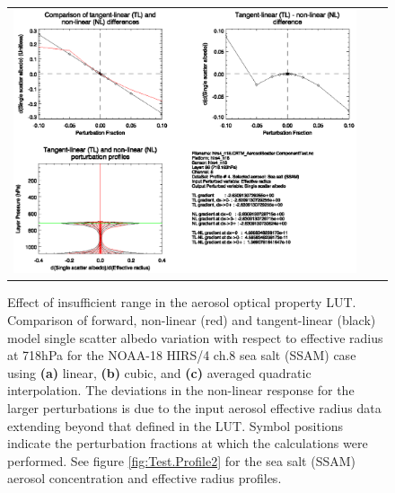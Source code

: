 \begin{figure}[htp]
\begin{tabular}{c c c}
    \includegraphics[bb=90 400 300 540,clip,scale=0.7]{graphics/Aerosol/TL/hirs4_n18.ch8.SSAM.AVGQUAD.dw_dReff.eps} 
  \end{tabular}
  \caption{Effect of insufficient range in the aerosol optical property LUT. Comparison of forward, non-linear (red) and tangent-linear (black) model single scatter albedo variation with respect to effective radius at 718hPa for the NOAA-18 HIRS/4 ch.8 sea salt (SSAM) case using \textbf{(a)} linear, \textbf{(b)} cubic, and \textbf{(c)} averaged quadratic interpolation. The deviations in the non-linear response for the larger perturbations is due to the input aerosol effective radius data extending beyond that defined in the LUT. Symbol positions indicate the perturbation fractions at which the calculations were performed. See figure \ref{fig:Test.Profile2} for the sea salt (SSAM) aerosol concentration and effective radius profiles.}
  \label{fig:hirs4_n18.ch8.SSAM.dw_dReff}
\end{figure}


